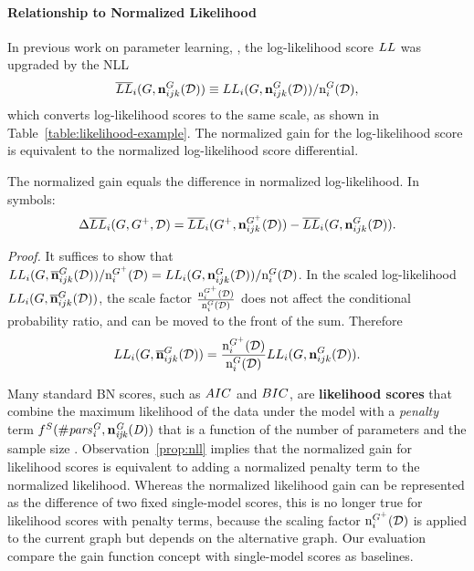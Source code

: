 \documentclass{article}
\begin{document}
\paragraph{Relationship to Normalized Likelihood} In previous work on parameter learning, \cite{Xiang2011,Schulte2011}, the log-likelihood score $LL$ was upgraded by the  NLL
$$
  \overline{LL}_{i}(G,\boldsymbol{\mathrm{n}}^{G}_{ijk}(\mathcal{D}))
  \equiv  LL_{i}(G,\boldsymbol{\mathrm{n}}^{G}_{ijk}(\mathcal{D}))/\mathrm{n}^{G}_{i}(\mathcal{D}),
$$ which converts log-likelihood scores to the same scale, as shown in Table~\ref{table:likelihood-example}. 
The normalized gain for the log-likelihood score is equivalent to the normalized log-likelihood score differential.

\begin{observation} \label{prop:nll}
The normalized gain equals the difference in normalized log-likelihood. In symbols: 
$$\Delta\overline{LL}_{i}(G,G^{+},\mathcal{D})=
\overline{LL}_{i}(G^{+},\boldsymbol{\mathrm{n}}^{G^{+}}_{ijk}(\mathcal{D})) - \overline{LL}_{i}(G,\boldsymbol{\mathrm{n}}^{G}_{ijk}(\mathcal{D})).$$
\end{observation}

\emph{Proof.} It suffices to show that $LL_{i}(G,\overline{\boldsymbol{\mathrm{n}}}^{G}_{ijk}(\mathcal{D}))/\mathrm{n}^{G^{+}}_{i}(\mathcal{D})=LL_{i}(G,\boldsymbol{\mathrm{n}}^{G}_{ijk}(\mathcal{D}))/\mathrm{n}^{G}_{i}(\mathcal{D})$. In the scaled log-likelihood $LL_{i}(G,\overline{\boldsymbol{\mathrm{n}}}^{G}_{ijk}(\mathcal{D}))$, the scale factor $\frac{\mathrm{n}^{G^{+}}_{i}(\mathcal{D})}{\mathrm{n}^{G}_{i}(\mathcal{D})}$ does not affect the conditional probability ratio, and can be moved to the front of the sum. Therefore $$LL_{i}(G,\overline{\boldsymbol{\mathrm{n}}}^{G}_{ijk}(\mathcal{D}))=
\frac{\mathrm{n}^{G^{+}}_{i}(\mathcal{D})}{\mathrm{n}^{G}_{i}(\mathcal{D})}
LL_{i}(G,\boldsymbol{\mathrm{n}}^{G}_{ijk}(\mathcal{D})).$$

Many standard BN scores, such as  $AIC$ and $BIC$, are {\bf likelihood scores} that combine the maximum likelihood of the data under the model with a {\em penalty} term $f^{S}(\#\it{pars}_{i}^{G},\boldsymbol{\mathrm{n}}^{G}_{ijk}(D))$ that is a function of the number of parameters and the sample size \cite{bouckaert95:_bayes}. Observation~\ref{prop:nll} implies that the normalized gain for likelihood scores is equivalent to adding a normalized penalty term to the normalized likelihood. Whereas the normalized likelihood gain can be represented as the difference of two fixed single-model scores, this is no longer true for likelihood scores with penalty terms, because the scaling factor $\mathrm{n}^{G^{+}}_{i}(\mathcal{D})$ is applied to the current graph but depends on the alternative graph. 
Our evaluation compare the gain function concept  with single-model scores as baselines.
\end{document}
